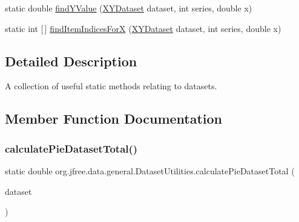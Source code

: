 \begin{DoxyCompactItemize}
\item 
static double \mbox{\hyperlink{classorg_1_1jfree_1_1data_1_1general_1_1_dataset_utilities_ae29a90bb6a00a0c36ccfc5d7e57c1c24}{find\+Y\+Value}} (\mbox{\hyperlink{interfaceorg_1_1jfree_1_1data_1_1xy_1_1_x_y_dataset}{X\+Y\+Dataset}} dataset, int series, double x)
\item 
static int \mbox{[}$\,$\mbox{]} \mbox{\hyperlink{classorg_1_1jfree_1_1data_1_1general_1_1_dataset_utilities_ae727ed5d95a88a13383158f81a4eb6b0}{find\+Item\+Indices\+ForX}} (\mbox{\hyperlink{interfaceorg_1_1jfree_1_1data_1_1xy_1_1_x_y_dataset}{X\+Y\+Dataset}} dataset, int series, double x)
\end{DoxyCompactItemize}


\subsection{Detailed Description}
A collection of useful static methods relating to datasets. 

\subsection{Member Function Documentation}
\mbox{\label{classorg_1_1jfree_1_1data_1_1general_1_1_dataset_utilities_a576a9d596284f3e70b5db2d35bc0c935}} 
\subsubsection{\texorpdfstring{calculate\+Pie\+Dataset\+Total()}{calculatePieDatasetTotal()}}
{\footnotesize\ttfamily static double org.\+jfree.\+data.\+general.\+Dataset\+Utilities.\+calculate\+Pie\+Dataset\+Total (\begin{DoxyParamCaption}\item[{\mbox{\hyperlink{interfaceorg_1_1jfree_1_1data_1_1general_1_1_pie_dataset}{Pie\+Dataset}}}]{dataset }\end{DoxyParamCaption})\hspace{0.3cm}{\ttfamily [static]}}

